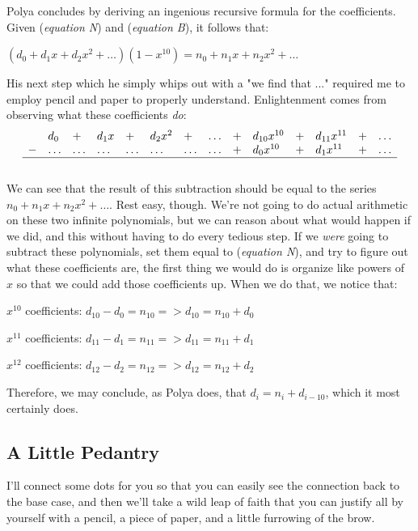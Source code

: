 Polya concludes by deriving an ingenious recursive formula for the coefficients.  Given (\textit{equation N}) and (\textit{equation B}), it follows that:
\begin{center}
$(d_0 + d_1x + d_2x^2 + \ldots)(1 - x^{10}) = n_0 + n_1x + n_2x^2 + \ldots$
\end{center}
His next step which he simply whips out with a "we find that ..." required me to employ pencil and paper to properly understand.  Enlightenment comes from observing what these coefficients \textit{do}:
\[
\begin{array}{l l l l l l l l l l l l l l }
  & d_0 & + & d_1x & + & d_2x^2 & + & \ldots & + & d_{10}x^{10} & + & d_{11}x^{11} & + & \ldots \\
- & \ldots & \ldots & \ldots & \ldots & \ldots & \ldots & \ldots & + & d_0x^{10} & + & d_1x^{11} & + & \ldots \\
\hline
\end{array}
\]
\\
We can see that the result of this subtraction should be equal to the series $n_0 + n_1x + n_2x^2 + \ldots$.  Rest easy, though.  We're not going to do actual arithmetic on these two infinite polynomials, but we can reason about what would happen if we did, and this without having to do every tedious step.  If we \textit{were} going to subtract these polynomials, set them equal to (\textit{equation N}), and try to figure out what these coefficients are, the first thing we would do is organize like powers of $x$ so that we could add those coefficients up. When we do that, we notice that:
\begin{center}
$x^{10}$ coefficients: $d_{10} - d_0 = n_{10} => d_{10} = n_{10} + d_0$

$x^{11}$ coefficients: $d_{11} - d_1 = n_{11} => d_{11} = n_{11} + d_1$

$x^{12}$ coefficients: $d_{12} - d_2 = n_{12} => d_{12} = n_{12} + d_2$
\end{center}
Therefore, we may conclude, as Polya does, that $d_i = n_i + d_{i-10}$, which it most certainly does.
\subsection{A Little Pedantry}
I'll connect some dots for you so that you can easily see the connection back to the base case, and then we'll take a wild leap of faith that you can justify all by yourself with a pencil, a piece of paper, and a little furrowing of the brow.

